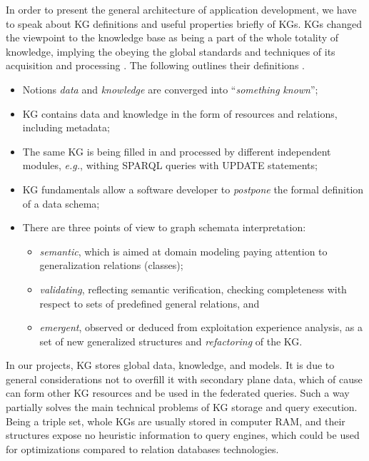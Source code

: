 \documentclass[
]{ceurart}
\begin{document}
In order to present the general architecture of application development, we have to speak about KG definitions and useful properties briefly of KGs.
KGs changed the viewpoint to the knowledge base as being a part of the whole totality of knowledge, implying the obeying the global standards and techniques of its acquisition and processing \cite{hogan}. The following outlines their definitions \cite{hogan}.
 \begin{itemize}
  \item Notions \emph{data} and \emph{knowledge} are converged into ``\emph{something} \emph{known}'';
  \item KG contains data and knowledge in the form of resources and relations, including metadata;
  \item The same KG is being filled in and processed by different independent modules, \emph{e.g.}, withing SPARQL queries with UPDATE statements;
  \item KG fundamentals allow a software developer to \emph{postpone} the formal definition of a data schema;
  \item There are three points of view to graph schemata interpretation:
    \begin{itemize}
    \item \emph{semantic}, which is aimed at domain modeling paying attention to generalization relations (classes);
    \item \emph{validating}, reflecting semantic verification, checking completeness with respect to sets of predefined general relations, and
    \item \emph{emergent}, observed or deduced from exploitation experience analysis, as a set of new generalized structures and \emph{refactoring} of the KG.
    \end{itemize}
  \end{itemize}

In our projects, KG stores global data, knowledge, and models. It is due to general considerations not to overfill it with secondary plane data, which of cause can form other KG resources and be used in the federated queries. Such a way partially solves the main technical problems of KG storage and query execution. Being a triple set, whole KGs are usually stored in computer RAM, and their structures expose no heuristic information to query engines, which could be used for optimizations compared to relation databases technologies.
\end{document}
